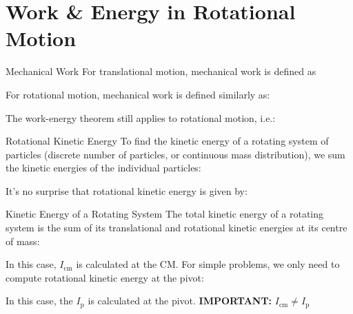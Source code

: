 \documentclass[12pt,compress,aspectratio=169]{beamer}
\begin{document}
\section{Work \& Energy in Rotational Motion}

\begin{frame}{Mechanical Work}
  For translational motion, mechanical work is defined as


  For rotational motion, mechanical work is defined similarly as:


  The work-energy theorem still applies to rotational motion, i.e.:

\end{frame}



\begin{frame}{Rotational Kinetic Energy}
  To find the kinetic energy of a rotating system of particles (discrete number
  of particles, or continuous mass distribution), we sum the
  kinetic energies of the individual particles:
    
  
  It's no surprise that rotational kinetic energy is given by:
  
\end{frame}



\begin{frame}{Kinetic Energy of a Rotating System}
  The total kinetic energy of a rotating system is the sum of its translational
  and rotational kinetic energies at its centre of mass:

  
  In this case, $I_\text{cm}$ is calculated at the CM. For simple problems, we
  only need to compute rotational kinetic energy at the pivot:

  
  In this case, the $I_\text{p}$ is calculated at the pivot.
  \textbf{IMPORTANT:} $I_\text{cm}\neq I_\text{p}$
\end{frame}
\end{document}
